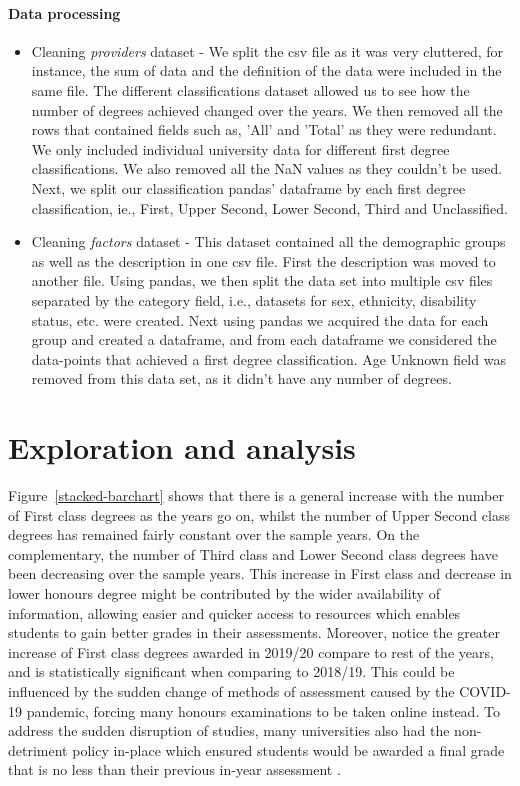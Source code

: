 \documentclass[11pt,a4paper]{article}
\begin{document}
\paragraph{Data processing} 
\begin{itemize}
    \item Cleaning \textit{providers} dataset - 
    We split the csv file as it was very cluttered, for instance, the sum of data  and the definition of the data were included in the same file. The different classifications dataset allowed us to see how the number of degrees achieved changed over the years. We then removed all the rows that contained fields such as, 'All' and 'Total' as they were redundant. We only included individual university data for different first degree classifications. We also removed all the NaN values as they couldn't be used. Next, we split our classification pandas' dataframe by each first degree classification, ie., First, Upper Second, Lower Second, Third and Unclassified.

    \item Cleaning \textit{factors} dataset -
    This dataset contained all the demographic groups as well as the description in one csv file. First the description was moved to another file. Using pandas, we then split the data set into multiple csv files separated by the category field, i.e., datasets for sex, ethnicity, disability status, etc. were created. Next using pandas we acquired the data for each group and created a dataframe, and from each dataframe we considered the data-points that achieved a first degree classification. Age Unknown field was removed from this data set, as it didn't have any number of degrees.
\end{itemize}
\section{Exploration and  analysis}

Figure~\ref{stacked-barchart} shows that there is a general increase with the number of First class degrees as the years go on, whilst the number of Upper Second class degrees has remained fairly constant over the sample years. On the complementary, the number of Third class and Lower Second class degrees have been decreasing over the sample years. This increase in First class and decrease in lower honours degree might be contributed by the wider availability of information, allowing easier and quicker access to resources which enables students to gain better grades in their assessments. Moreover, notice the greater increase of First class degrees awarded in 2019/20 compare to rest of the years, and is statistically significant when comparing to 2018/19. This could be influenced by the sudden change of methods of assessment caused by the COVID-19 pandemic, forcing many honours examinations to be taken online instead. To address the sudden disruption of studies, many universities also had the non-detriment policy in-place which ensured students would be awarded a final grade that is no less than their previous in-year assessment \cite{Guardian_2020_grade_inflation}.
\end{document}
